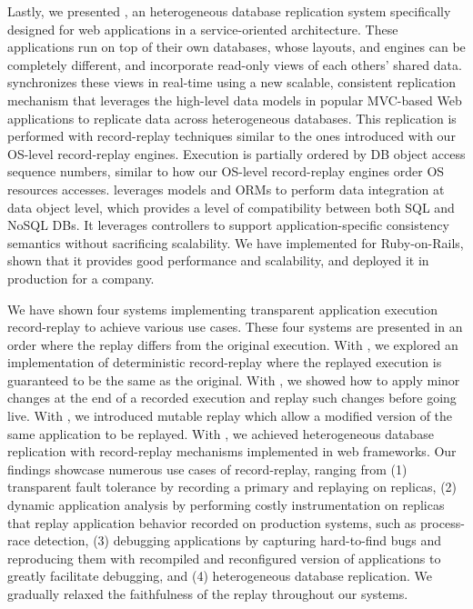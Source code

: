 Lastly, we presented \synapse, an heterogeneous database replication system
specifically designed for web applications in a service-oriented architecture.
These applications run on top of their own databases,
whose layouts, and engines can be completely different, and incorporate
read-only views of each others' shared data. \synapse synchronizes these views
in real-time using a new scalable, consistent replication mechanism that
leverages the high-level data models in popular MVC-based Web applications to
replicate data across heterogeneous databases.
This replication is performed with record-replay techniques similar to
the ones introduced with our OS-level record-replay engines.
Execution is partially ordered by DB object access sequence numbers,
similar to how our OS-level record-replay engines order OS resources accesses.
\synapse leverages models and ORMs to perform data integration
at data object level, which provides a level of compatibility between both SQL
and NoSQL DBs. It leverages controllers to support application-specific
consistency semantics without sacrificing scalability.  We have implemented
\synapse for Ruby-on-Rails, shown that it provides good performance and
scalability, and deployed it in production for a company.

We have shown four systems implementing transparent application execution
record-replay to achieve various use cases. These four systems are presented
in an order where the replay differs from the original execution.
With \scribe, we explored an implementation of deterministic record-replay where
the replayed execution is guaranteed to be the same as the original.
With \racepro, we showed how to apply minor changes at the end of a
recorded execution and replay such changes before going live.
With \dora, we introduced mutable replay which allow a modified version
of the same application to be replayed.
With \synapse, we achieved heterogeneous database replication with
record-replay mechanisms implemented in web frameworks.
Our findings showcase numerous
use cases of record-replay, ranging from (1) transparent fault tolerance
by recording a primary and replaying on replicas, (2) dynamic application
analysis by performing costly instrumentation on replicas that replay
application behavior recorded on production systems, such as process-race
detection, (3) debugging applications by capturing hard-to-find bugs and
reproducing them with recompiled and reconfigured version of applications to
greatly facilitate debugging, and (4) heterogeneous database replication.
We gradually relaxed the faithfulness of the replay throughout our systems.

